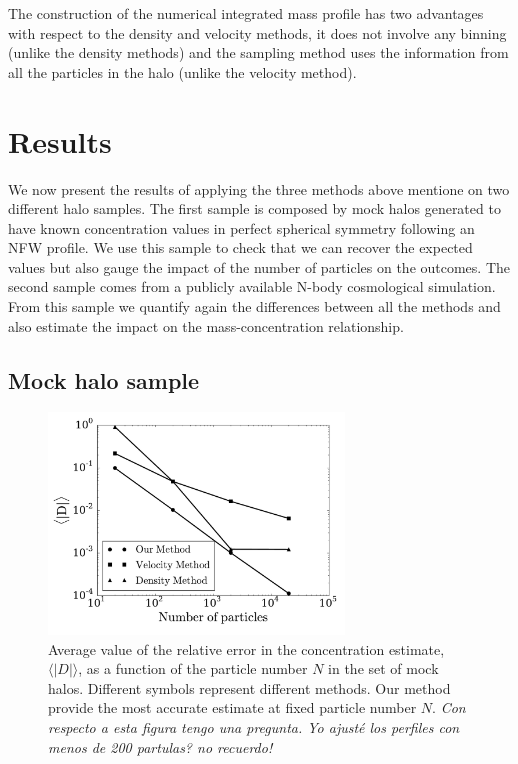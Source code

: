 \documentclass[a4,useAMS,usenatbib,usegraphicx]{mn2e}
\newcommand{\avg}[1]{\langle{#1}\rangle}
\begin{document}
The construction of the numerical integrated mass profile has two
advantages with respect to the density and velocity methods, it does
not involve any binning (unlike the density methods) and the sampling
method uses the information from all the particles in the halo (unlike
the velocity method).


\section{Results}
\label{sec:results}

We now present the results of applying the three methods above
mentione on two different halo samples.  The first sample is composed
by mock halos generated to have known concentration values in perfect
spherical symmetry following an NFW profile.  We use this sample to
check that we can recover the expected values but also gauge the
impact of the number of particles on the outcomes.  The second sample
comes from a publicly available N-body cosmological simulation.  From
this sample we quantify again the differences between all the methods
and also estimate the impact on the mass-concentration relationship.


\subsection{Mock halo sample}

\begin{figure}
\begin{center}
  \includegraphics[width=0.70\textwidth]{error.pdf}
\end{center}
\caption{Average value of the relative error in the concentration
  estimate, $\avg{|D|}$, as a function of the particle number $N$ in
  the set of mock halos. Different symbols represent different
  methods. Our method provide the most accurate estimate at fixed
  particle number $N$.  {\it Con respecto a esta figura tengo una
    pregunta. Yo ajusté los perfiles con menos de 200 partulas? no
    recuerdo!}
    \label{fig:error}}
\end{figure}
\end{document}
